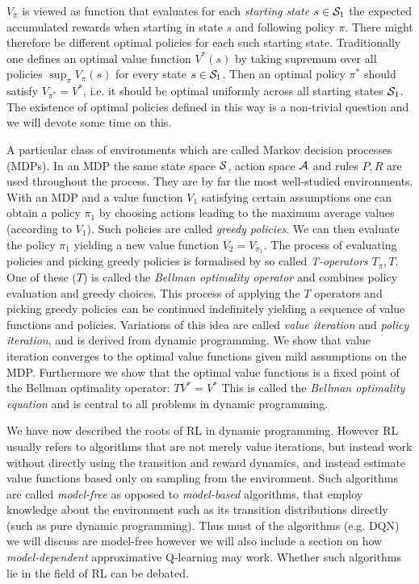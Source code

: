 $V_\pi$ is viewed as function that evaluates for each \emph{starting state}
$s \in \mathcal{S}_1$ the expected accumulated rewards when starting in state $s$
and following policy $\pi$.
There might therefore be different optimal policies for each such starting
state.
Traditionally one defines an optimal value function $V^*(s)$
by taking supremum over all policies $\sup_\pi V_\pi(s)$ for every state
$s \in \mathcal{S}_1$.
Then an optimal policy $\pi^*$ should satisfy $V_{\pi^*} = V^*$,
i.e. it should be optimal uniformly across all starting states $\mathcal{S}_1$.
The existence of optimal policies defined in this way is a non-trivial
question and we will devote some time on this.

A particular class of environments which are called Markov decision processes
(MDPs).
In an MDP the same state space $\mathcal{S}$, action space $\mathcal{A}$ and rules
$P, R$ are used throughout the process.
They are by far the most well-studied environments.
With an MDP and a value function $V_1$ satisfying certain assumptions 
one can obtain a policy $\pi_1$ by choosing actions
leading to the maximum average values (according to $V_1$).
Such policies are called \emph{greedy policies}.
We can then evaluate the policy $\pi_1$
yielding a new value function $V_2 = V_{\pi_1}$.
The process of evaluating policies and picking greedy policies
is formalised by so called \emph{T-operators} $T_\pi, T$.
One of these ($T$) is called the \emph{Bellman optimality operator}
and combines policy evaluation and greedy choices.
This process of applying the $T$ operators and picking greedy policies
can be continued indefinitely yielding a sequence of value
functions and policies.
Variations of this idea are called \emph{value iteration} and
\emph{policy iteration},
and is derived from dynamic programming.
We show that value iteration converges to the optimal value functions
given mild assumptions on the MDP.
Furthermore we show that the optimal value functions is a fixed point
of the Bellman optimality operator: $TV^* = V^*$
This is called the \emph{Bellman optimality equation} and
is central to all problems in dynamic programming.

We have now described the roots of RL in dynamic programming.
However RL usually refers to algorithms that
are not merely value iterations, but instead work without
directly using the transition and reward dynamics,
and instead estimate value functions based only on sampling from the
environment.
Such algorithms are called \emph{model-free} as opposed to
\emph{model-based} algorithms, that employ knowledge about the
environment such as its transition distributions directly
(such as pure dynamic programming).
Thus must of the algorithms (e.g. DQN) we will discuss are model-free
however we will also include a section on how \emph{model-dependent}
approximative Q-learning may work. Whether such algorithms lie in the
field of RL can be debated.

